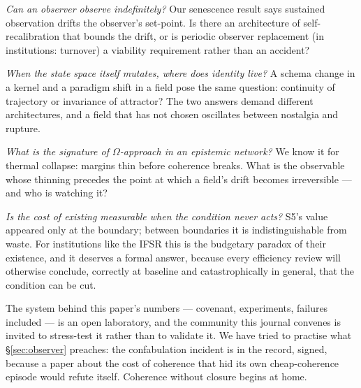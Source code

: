 \documentclass[12pt]{article}
\begin{document}
\emph{Can an observer observe indefinitely?} Our senescence result says
sustained observation drifts the observer's set-point. Is there an
architecture of self-recalibration that bounds the drift, or is periodic
observer replacement (in institutions: turnover) a viability requirement
rather than an accident?

\emph{When the state space itself mutates, where does identity live?} A
schema change in a kernel and a paradigm shift in a field pose the same
question: continuity of trajectory or invariance of attractor? The two
answers demand different architectures, and a field that has not chosen
oscillates between nostalgia and rupture.

\emph{What is the signature of $\Omega$-approach in an epistemic network?}
We know it for thermal collapse: margins thin before coherence breaks. What
is the observable whose thinning precedes the point at which a field's drift
becomes irreversible --- and who is watching it?

\emph{Is the cost of existing measurable when the condition never acts?} S5's
value appeared only at the boundary; between boundaries it is indistinguishable
from waste. For institutions like the IFSR this is the budgetary paradox of
their existence, and it deserves a formal answer, because every efficiency
review will otherwise conclude, correctly at baseline and catastrophically in
general, that the condition can be cut.

The system behind this paper's numbers --- covenant, experiments, failures
included --- is an open laboratory, and the community this journal convenes is
invited to stress-test it rather than to validate it. We have tried to
practise what \S\ref{sec:observer} preaches: the confabulation incident is in
the record, signed, because a paper about the cost of coherence that hid its
own cheap-coherence episode would refute itself. Coherence without closure
begins at home.



\end{document}
